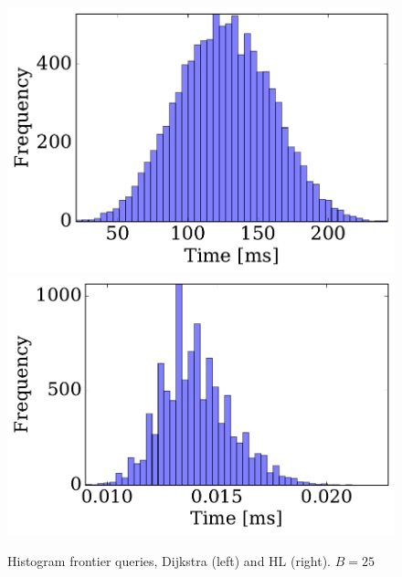 \begin{figure} \caption{Histogram frontier queries, Dijkstra (left) and HL (right). $B=25$}\label{fig:SF_query}
\begin{center}
\includegraphics[clip, trim=0.2cm 0.3cm 0.2cm 0.2cm,scale=0.29]{TexImg/SF_query_dij_B25.pdf}
\includegraphics[clip, trim=1cm 0.3cm 0.2cm 0.2cm,scale=0.29]{TexImg/SF_query_hl_B25.pdf}
\end{center}
\end{figure}

